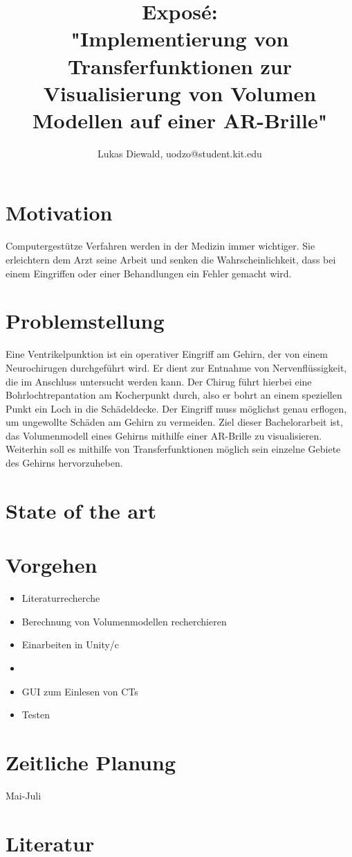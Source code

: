 \documentclass{article}
\title{
Exposé:\\
 \textbf{"Implementierung von Transferfunktionen zur Visualisierung von Volumen Modellen auf einer AR-Brille"}
}
\author{Lukas Diewald, uodzo@student.kit.edu}
\begin{document}
\maketitle

\clearpage
\section{Motivation}
Computergestütze Verfahren werden in der Medizin immer wichtiger. Sie erleichtern dem Arzt seine Arbeit und senken die Wahrscheinlichkeit, dass bei einem Eingriffen oder einer Behandlungen ein Fehler gemacht wird.

\section{Problemstellung}
Eine Ventrikelpunktion ist ein operativer Eingriff am Gehirn, der von einem Neurochirugen durchgeführt wird. Er dient zur Entnahme von Nervenflüssigkeit, die im Anschluss untersucht werden kann. Der Chirug führt hierbei eine Bohrlochtrepantation am Kocherpunkt durch, also er bohrt an einem speziellen Punkt ein Loch in die Schädeldecke. Der Eingriff muss möglichst genau erflogen, um ungewollte Schäden am Gehirn zu vermeiden.
\newline
Ziel dieser Bachelorarbeit ist, das Volumenmodell eines Gehirns mithilfe einer AR-Brille zu visualisieren. Weiterhin soll es mithilfe von Transferfunktionen möglich sein einzelne Gebiete des Gehirns hervorzuheben.

\section{State of the art}

\section{Vorgehen}
\begin{itemize}
	\item Literaturrecherche
	\item Berechnung von Volumenmodellen recherchieren
	\item Einarbeiten in Unity/c
	\item 
	\item GUI zum Einlesen von CTs
	\item Testen
\end{itemize}
\section{Zeitliche Planung}
Mai-Juli

\section{Literatur}
\end{document}
